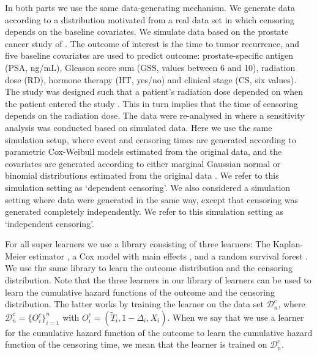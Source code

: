 \documentclass[a4paper,danish]{article}
\theoremstyle{plain} %
\numberwithin{theorem}{section}
\theoremstyle{definition} %
\theoremstyle{remark}
\newcommand{\1}{\mathds{1}}
\newcommand{\data}{\ensuremath{\mathcal{D}}}
\begin{document}
In both parts we use the same data-generating mechanism. We generate data
according to a distribution motivated from a real data set in which censoring
depends on the baseline covariates. We simulate data based on the prostate
cancer study of \cite{kattan2000pretreatment}. The outcome of interest is the
time to tumor recurrence, and five baseline covariates are used to predict
outcome: prostate-specific antigen (PSA, ng/mL), Gleason score sum (GSS, values
between 6 and 10), radiation dose (RD), hormone therapy (HT, yes/no) and
clinical stage (CS, six values). The study was designed such that a patient's
radiation dose depended on when the patient entered the study
\citep{gerds2013estimating}. This in turn implies that the time of censoring
depends on the radiation dose. The data were re-analysed in
\citep{gerds2013estimating} where a sensitivity analysis was conducted based on
simulated data. Here we use the same simulation setup, where event and censoring
times are generated according to parametric Cox-Weibull models estimated from
the original data, and the covariates are generated according to either marginal
Gaussian normal or binomial distributions estimated from the original data
\citep[c.f.,][Section~4.6]{gerds2013estimating}. We refer to this simulation
setting as `dependent censoring'. We also considered a simulation setting where
data were generated in the same way, except that censoring was generated
completely independently. We refer to this simulation setting as `independent
censoring'.

For all super learners we use a library consisting of three
learners: The Kaplan-Meier estimator
\citep{kaplan1958nonparametric,Gerds_2019prodlim}, a Cox model
with main effects \citep{cox1972regression, survival-package},
and a random survival forest
\citep{ishwaran2008random,randomForestSRC}. We use the same
library to learn the outcome distribution and the censoring
distribution. Note that the three learners in our library of
learners can be used to learn the cumulative hazard functions
of the outcome and the censoring distribution. The latter
works by training the learner on the data set \( \data_n^c \),
where \( \data_n^c = \{O_i^c\}_{i=1}^n \) with
\( O_i^c = (\tilde{T}_i, 1-\Delta_i, X_i) \). When we say that
we use a learner for the cumulative hazard function of the
outcome to learn the cumulative hazard function of the
censoring time, we mean that the learner is trained on
\( \data_n^c \).
\end{document}

